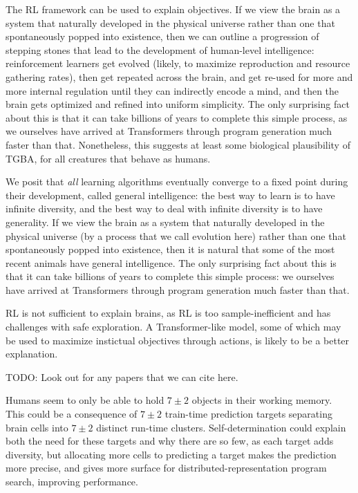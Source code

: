 \documentclass{article}
\begin{document}
The RL framework can be used to explain objectives. If we view the brain as a system that naturally developed in the physical universe rather than one that spontaneously popped into existence, then we can outline a progression of stepping stones that lead to the development of human-level intelligence: reinforcement learners get evolved (likely, to maximize reproduction and resource gathering rates), then get repeated across the brain, and get re-used for more and more internal regulation until they can indirectly encode a mind, and then the brain gets optimized and refined into uniform simplicity. The only surprising fact about this is that it can take billions of years to complete this simple process, as we ourselves have arrived at Transformers through program generation much faster than that. Nonetheless, this suggests at least some biological plausibility of TGBA, for all creatures that behave as humans.

We posit that \textit{all} learning algorithms eventually converge to a fixed point during their development, called general intelligence: the best way to learn is to have infinite diversity, and the best way to deal with infinite diversity is to have generality. If we view the brain as a system that naturally developed in the physical universe (by a process that we call evolution here) rather than one that spontaneously popped into existence, then it is natural that some of the most recent animals have general intelligence. The only surprising fact about this is that it can take billions of years to complete this simple process: we ourselves have arrived at Transformers through program generation much faster than that.

RL is not sufficient to explain brains, as RL is too sample-inefficient and has challenges with safe exploration. A Transformer-like model, some of which may be used to maximize instictual objectives through actions, is likely to be a better explanation.

    TODO: Look out for any papers that we can cite here.

Humans seem to only be able to hold $7\pm2$ objects in their working memory. This could be a consequence of $7\pm2$ train-time prediction targets separating brain cells into $7\pm2$ distinct run-time clusters. Self-determination could explain both the need for these targets and why there are so few, as each target adds diversity, but allocating more cells to predicting a target makes the prediction more precise, and gives more surface for distributed-representation program search, improving performance.
\end{document}
